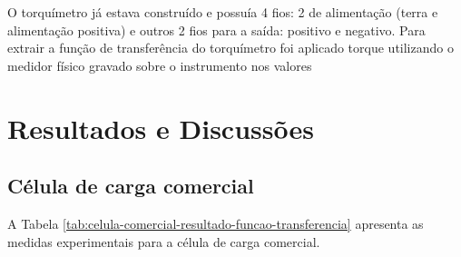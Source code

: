 \documentclass[a4paper]{instrumentacao}
\begin{document}
O torquímetro já estava construído e possuía 4 fios: 2 de alimentação (terra e alimentação positiva) e outros 2 fios para a saída: positivo e negativo. Para extrair a função de transferência do torquímetro foi aplicado torque utilizando o medidor físico gravado sobre o instrumento nos valores 


\chapter{Resultados e Discussões}

\section{Célula de carga comercial}
A Tabela \ref{tab:celula-comercial-resultado-funcao-transferencia} apresenta as medidas experimentais para a célula de carga comercial.
\end{document}
